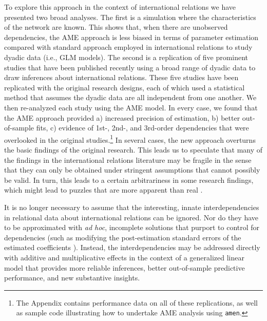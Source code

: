 To explore this approach in the context of international relations we have presented two broad analyses. The first is a simulation where the characteristics of the network are known. This shows that, when there are unobserved dependencies, the AME approach is less biased in terms of parameter estimation compared with standard approach employed in international relations to study dyadic data (i.e., GLM models). The second is a replication of five prominent studies that have been published recently using a broad range of dyadic data to draw inferences about international relations.  These five studies have been replicated with the original research designs, each of which used a statistical method that assumes the dyadic data are all independent from one another.  We then re-analyzed each study using the AME model.  In every case, we found that the AME approach provided a) increased precision of estimation, b) better out-of-sample fits, c) evidence of 1st-, 2nd-, and 3rd-order dependencies that were overlooked in the original studies.\footnote{The Appendix contains performance data on all of these replications, as well as sample code illustrating how to undertake AME analysis using \texttt{amen}.} In several cases, the new approach overturns the basic findings of the original research.  This leads us to speculate that many of the findings in the international relations literature may be fragile in the sense that they can only be obtained under stringent assumptions that cannot possibly be valid.  In turn, this leads to a certain arbitrariness in some research findings, which might lead to puzzles that are more apparent than real \citep{zinnes:1980}.  

It is no longer necessary to assume that the interesting, innate interdependencies in relational data about international relations can be ignored. Nor do they have to be approximated with \textit{ad hoc}, incomplete solutions that purport to control for dependencies (such as modifying the post-estimation standard errors of the estimated coefficients \citep{king:roberts:2014}). Instead, the interdependencies may be addressed directly with additive and multiplicative effects in the context of a generalized linear model that provides more reliable inferences, better out-of-sample predictive performance, and new substantive insights. 


